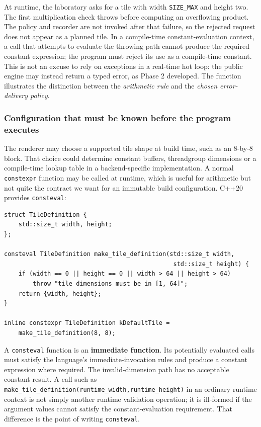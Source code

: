 At runtime, the laboratory asks for a tile with width \texttt{SIZE\_MAX} and height two. The first multiplication check throws before computing an overflowing product. The policy and recorder are not invoked after that failure, so the rejected request does not appear as a planned tile. In a compile-time constant-evaluation context, a call that attempts to evaluate the throwing path cannot produce the required constant expression; the program must reject its use as a compile-time constant. This is not an excuse to rely on exceptions in a real-time hot loop: the public engine may instead return a typed error, as Phase 2 developed. The function illustrates the distinction between the \emph{arithmetic rule} and the \emph{chosen error-delivery policy}.

\subsubsection{Configuration that must be known before the program executes}\label{configuration-that-must-be-known-before-the-program-executes}

The renderer may choose a supported tile shape at build time, such as an 8-by-8 block. That choice could determine constant buffers, threadgroup dimensions or a compile-time lookup table in a backend-specific implementation. A normal \texttt{constexpr} function may be called at runtime, which is useful for arithmetic but not quite the contract we want for an immutable build configuration. C++20 provides \texttt{consteval}:

\begin{verbatim}
struct TileDefinition {
    std::size_t width, height;
};

consteval TileDefinition make_tile_definition(std::size_t width,
                                               std::size_t height) {
    if (width == 0 || height == 0 || width > 64 || height > 64)
        throw "tile dimensions must be in [1, 64]";
    return {width, height};
}

inline constexpr TileDefinition kDefaultTile =
    make_tile_definition(8, 8);
\end{verbatim}

A \texttt{consteval} function is an \textbf{immediate function}. Its potentially evaluated calls must satisfy the language's immediate-invocation rules and produce a constant expression where required. The invalid-dimension path has no acceptable constant result. A call such as \texttt{make\_tile\_definition(runtime\_width,runtime\_height)} in an ordinary runtime context is not simply another runtime validation operation; it is ill-formed if the argument values cannot satisfy the constant-evaluation requirement. That difference is the point of writing \texttt{consteval}.

